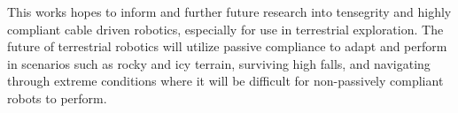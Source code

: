 This works hopes to inform and further future research into tensegrity and highly compliant cable driven robotics, especially for use in terrestrial exploration.
The future of terrestrial robotics will utilize passive compliance to adapt and perform in scenarios such as rocky and icy terrain, surviving high falls, and navigating through extreme conditions where it will be difficult for non-passively compliant robots to perform.










